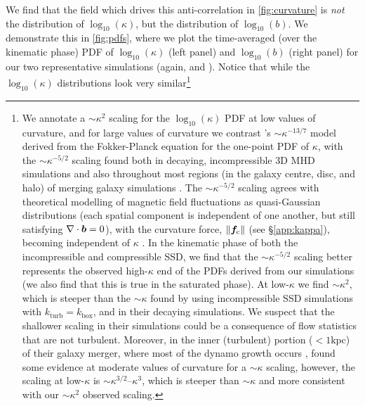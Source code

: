 We find that the field which drives this anti-correlation in \autoref{fig:curvature} is \textit{not} the distribution of $\log_{10}(\kappa)$, but the distribution of $\log_{10}(b)$. We demonstrate this in \autoref{fig:pdfs}, where we plot the time-averaged (over the kinematic phase) PDF of $\log_{10}(\kappa)$ (left panel) and $\log_{10}(b)$ (right panel) for our two representative simulations (again,  and ). Notice that while the $\log_{10}(\kappa)$ distributions look very similar\footnote{
    We annotate a $\sim \kappa^2$ scaling for the $\log_{10}(\kappa)$ PDF at low values of curvature, and for large values of curvature we contrast \citet{schekochihin2002small}'s \mbox{$\sim \kappa^{-13/7}$} model derived from the Fokker-Planck equation for the one-point PDF of $\kappa$, with the \mbox{$\sim \kappa^{-5/2}$} scaling found both in decaying, incompressible 3D MHD simulations \citep{yang2019role} and also throughout most regions (\ie in the galaxy centre, disc, and halo) of merging galaxy simulations \citep{pfrommer2022simulating}. The $\sim \kappa^{-5/2}$ scaling agrees with theoretical modelling of magnetic field fluctuations as quasi-Gaussian distributions (each spatial component is independent of one another, but still satisfying $\nabla\cdot\bm{b} = 0$), with the curvature force, $\|\bm{f}_\mathrm{c}\|$ (see \S\ref{app:kappa}), becoming independent of $\kappa$ \citep{yang2019role, pfrommer2022simulating}. In the kinematic phase of both the incompressible and compressible SSD, we find that the $\sim \kappa^{-5/2}$ scaling better represents the observed high-$\kappa$ end of the PDFs derived from our simulations (we also find that this is true in the saturated phase). At low-$\kappa$ we find $\sim \kappa^2$, which is steeper than the $\sim \kappa$ found by \citet{schekochihin2002small} using incompressible SSD simulations with $k_\mathrm{turb} = k_\mathrm{box}$, and \citet{yang2019role} in their decaying simulations. We suspect that the shallower scaling in their simulations could be a consequence of flow statistics that are not turbulent. Moreover, in the inner (turbulent) portion ($< 1 \mathrm{kpc}$) of their galaxy merger, where most of the dynamo growth occurs \citep[\eg][]{whittingham2021impact}, \citet{pfrommer2022simulating} found some evidence at moderate values of curvature for a $\sim \kappa$ scaling, however, the scaling at low-$\kappa$ is $\sim \kappa^{3/2}$--$\kappa^3$, which is steeper than $\sim \kappa$ and more consistent with our $\sim \kappa^2$ observed scaling.
}
